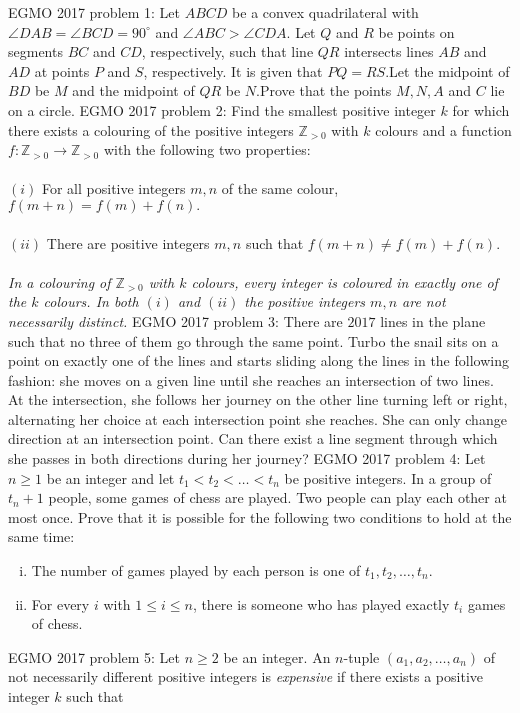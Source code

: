EGMO 2017 problem 1:  Let $ABCD$ be a convex quadrilateral with $\angle DAB=\angle BCD=90^{\circ}$ and $\angle ABC> \angle CDA$. Let $Q$ and $R$ be points on segments $BC$ and $CD$, respectively, such that line $QR$ intersects lines $AB$ and $AD$ at points $P$ and $S$, respectively. It is given that $PQ=RS$.Let the midpoint of $BD$ be $M$ and the midpoint of $QR$ be $N$.Prove that the points $M,N,A$ and $C$ lie on a circle. 
EGMO 2017 problem 2:  Find the smallest positive integer $k$ for which there exists a colouring of the positive integers $\mathbb{Z}_{>0}$ with $k$ colours and a function $f:\mathbb{Z}_{>0}\to \mathbb{Z}_{>0}$ with the following two properties: \\\\
$(i)$ For all positive integers $m,n$ of the same colour, $f(m+n)=f(m)+f(n).$ \\\\
$(ii)$ There are positive integers $m,n$ such that $f(m+n)\ne f(m)+f(n).$ \\\\
\textit{In a colouring of $\mathbb{Z}_{>0}$ with $k$ colours, every integer is coloured in exactly one of the $k$ colours. In both $(i)$ and $(ii)$ the positive integers $m,n$ are not necessarily distinct.} 
EGMO 2017 problem 3:  There are $2017$ lines in the plane such that no three of them go through the same point. Turbo the snail sits on a point on exactly one of the lines and starts sliding along the lines in the following fashion: she moves on a given line until she reaches an intersection of two lines. At the intersection, she follows her journey on the other line turning left or right, alternating her choice at each intersection point she reaches. She can only change direction at an intersection point. Can there exist a line segment through which she passes in both directions during her journey? 
EGMO 2017 problem 4:  Let $n\geq1$ be an integer and let $t_1<t_2<\dots<t_n$ be positive integers. In a group of $t_n+1$ people, some games of chess are played. Two people can play each other at most once. Prove that it is possible for the following two conditions to hold at the same time:
\begin{enumerate}[(i)]
  \item The number of games played by each person is one of $t_1,t_2,\dots,t_n$.
  \item For every $i$ with $1\leq i\leq n$, there is someone who has played exactly $t_i$ games of chess.
\end{enumerate} 
EGMO 2017 problem 5:  Let $n\geq2$ be an integer. An $n$-tuple $(a_1,a_2,\dots,a_n)$ of not necessarily different positive integers is \textit{expensive} if there exists a positive integer $k$ such that
